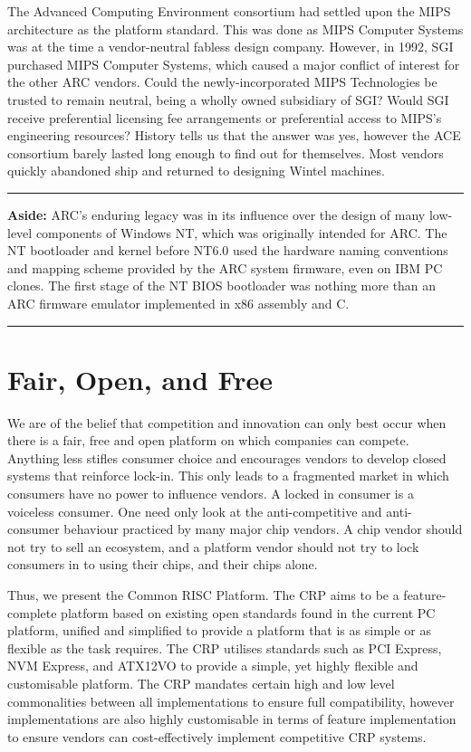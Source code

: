 \documentclass[12pt]{report}
\begin{document}
The Advanced Computing Environment consortium had settled upon the MIPS architecture as the platform standard. This was
done as MIPS Computer Systems was at the time a vendor-neutral fabless design company. However, in 1992, SGI purchased
MIPS Computer Systems, which caused a major conflict of interest for the other ARC vendors. Could the newly-incorporated
MIPS Technologies be trusted to remain neutral, being a wholly owned subsidiary of SGI? Would SGI receive preferential
licensing fee arrangements or preferential access to MIPS's engineering resources? History tells us that the answer was
yes, however the ACE consortium barely lasted long enough to find out for themselves. Most vendors quickly abandoned ship
and returned to designing Wintel machines.
\rule{16cm}{0.4pt}

\small
\textbf{Aside:} ARC's enduring legacy was in its influence over the design of many low-level
components of Windows NT, which was originally intended for ARC. The NT bootloader and kernel before NT6.0 used the
hardware naming conventions and mapping scheme provided by the ARC system firmware, even on IBM PC clones. The first stage
of the NT BIOS bootloader was nothing more than an ARC firmware emulator implemented in x86 assembly and C. \\
\normalsize
\rule{16cm}{0.4pt}

\section{Fair, Open, and Free}
We are of the belief that competition and innovation can only best occur when there is a fair, free and open platform
on which companies can compete. Anything less stifles consumer choice and encourages vendors to develop closed systems
that reinforce lock-in. This only leads to a fragmented market in which consumers have no power to influence vendors.
A locked in consumer is a voiceless consumer. One need only look at the anti-competitive and anti-consumer behaviour
practiced by many major chip vendors. A chip vendor should not try to sell an ecosystem, and a platform vendor should
not try to lock consumers in to using their chips, and their chips alone.

Thus, we present the Common RISC Platform. The CRP aims to be a feature-complete platform based on existing
open standards found in the current PC platform, unified and simplified to provide a platform that is as simple or as
flexible as the task requires. The CRP utilises standards such as PCI Express, NVM Express, and ATX12VO to provide a
simple, yet highly flexible and customisable platform. The CRP mandates certain high and low level commonalities
between all implementations to ensure full compatibility, however implementations are also highly customisable in terms
of feature implementation to ensure vendors can cost-effectively implement competitive CRP systems.
\end{document}
